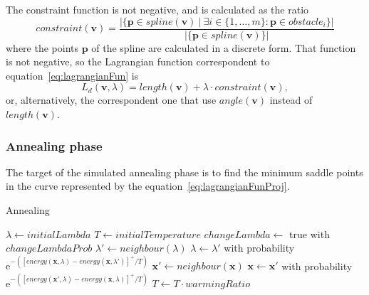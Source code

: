 \documentclass[a4paper]{article}
\newcommand{\me}{\ensuremath{\mathrm{e}}}
\begin{document}
The constraint function is not negative, and is calculated as the
ratio
\begin{equation*}
constraint(\mathbf{v}) = \frac{|\{\mathbf{p} \in spline(\mathbf{v})\ |\ \exists i\in\{1,\dots,m\}
  : \mathbf{p}\in obstacle_i \}|}{|\{\mathbf{p} \in spline(\mathbf{v})\}|}
\end{equation*}
where the points $\mathbf{p}$ of the spline are calculated in a discrete form. That
function is not negative, so the Lagrangian function correspondent to
equation~\eqref{eq:lagrangianFun} is
\begin{equation}\label{eq:lagrangianFunProj}
    L_d(\mathbf{v},\lambda)=length(\mathbf{v})+\lambda\cdot constraint(\mathbf{v}),
\end{equation}
or, alternatively, the correspondent one that use $angle(\mathbf{v})$ instead of $length(\mathbf{v})$.

\subsubsection{Annealing phase}
The target of the simulated annealing phase is to find the minimum
saddle points in
the curve represented by the
equation~\eqref{eq:lagrangianFunProj}.
\begin{algorithm}
 \caption{Annealing}\label{alg:annealing}
 \begin{algorithmic}[1]
   \State $\lambda\gets initialLambda$\label{alg:annealing:initialize}
   \State $T\gets initialTemperature$
   \label{alg:annealing:while}
   \label{alg:annealing:for}
   \State $changeLambda\gets$ true with $changeLambdaProb$\label{alg:annealing:lambdaProb}
   \State $\lambda'\gets neighbour(\lambda)$\label{alg:annealing:changeLambda}
   \State $\lambda\gets \lambda'$ with probability $\me^{-([energy(\mathbf{x},\lambda)-energy(\mathbf{x},\lambda')]^+/T)}$
   \Else
   \State $\mathbf{x}'\gets neighbour(\mathbf{x})$\label{alg:annealing:changeX}
   \State $\mathbf{x}\gets \mathbf{x}'$ with probability $\me^{-([energy(\mathbf{x}',\lambda)-energy(\mathbf{x},\lambda)]^+/T)}$
   \EndIf
   \EndFor
   \State $T\gets T\cdot warmingRatio$\label{alg:annealing:cooling}
   \EndWhile
   \EndProcedure
 \end{algorithmic}
\end{algorithm}
\end{document}
